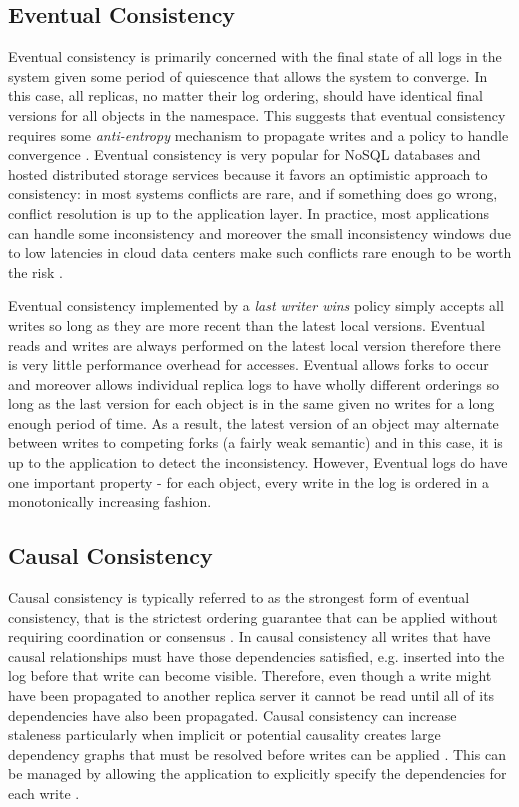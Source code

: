 \documentclass[10pt,conference,compsocconf,letterpaper]{IEEEtran}
\begin{document}
\subsection{Eventual Consistency}

Eventual consistency is primarily concerned with the final state of all logs in the system given some period of quiescence that allows the system to converge. In this case, all replicas, no matter their log ordering, should have identical final versions for all objects in the namespace. This suggests that eventual consistency requires some \textit{anti-entropy} mechanism to propagate writes and a policy to handle convergence \cite{terry_managing_1995}. Eventual consistency is very popular for NoSQL databases and hosted distributed storage services \cite{decandia_dynamo:_2007,lakshman_cassandra:_2010} because it favors an optimistic approach to consistency: in most systems conflicts are rare, and if something does go wrong, conflict resolution is up to the application layer. In practice, most applications can handle some inconsistency and moreover the small inconsistency windows due to low latencies in cloud data centers make such conflicts rare enough to be worth the risk \cite{bailis_quantifying_2014}.

Eventual consistency implemented by a \textit{last writer wins} policy simply accepts all writes so long as they are more recent than the latest local versions. Eventual reads and writes are always performed on the latest local version therefore there is very little performance overhead for accesses. Eventual allows forks to occur and moreover allows individual replica logs to have wholly different orderings so long as the last version for each object is in the same given no writes for a long enough period of time. As a result, the latest version of an object may alternate between writes to competing forks (a fairly weak semantic) and in this case, it is up to the application to detect the inconsistency. However, Eventual logs do have one important property - for each object, every write in the log is ordered in a monotonically increasing fashion.

\subsection{Causal Consistency}

Causal consistency is typically referred to as the strongest form of eventual consistency, that is the strictest ordering guarantee that can be applied without requiring coordination or consensus \cite{ladin_providing_1992}. In causal consistency all writes that have causal relationships must have those dependencies satisfied, e.g. inserted into the log before that write can become visible. Therefore, even though a write might have been propagated to another replica server it cannot be read until all of its dependencies have also been propagated. Causal consistency can increase staleness particularly when implicit or potential causality creates large dependency graphs that must be resolved before writes can be applied \cite{lloyd_dont_2011}. This can be managed by allowing the application to explicitly specify the dependencies for each write \cite{bailis_potential_2012}.
\end{document}
